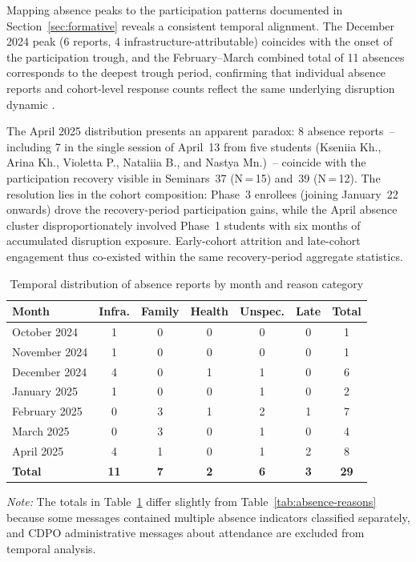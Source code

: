 Mapping absence peaks to the participation patterns documented in Section~\ref{sec:formative} reveals a consistent temporal alignment. The December 2024 peak (6 reports, 4 infrastructure-attributable) coincides with the onset of the participation trough, and the February--March combined total of 11 absences corresponds to the deepest trough period, confirming that individual absence reports and cohort-level response counts reflect the same underlying disruption dynamic \cite{Humeniuk2022113}.

The April 2025 distribution presents an apparent paradox: 8 absence reports~-- including 7 in the single session of April~13 from five students (Kseniia Kh., Arina Kh., Violetta P., Nataliia B., and Nastya Mn.)~-- coincide with the participation recovery visible in Seminars~37 (N\,=\,15) and~39 (N\,=\,12). The resolution lies in the cohort composition: Phase~3 enrollees (joining January~22 onwards) drove the recovery-period participation gains, while the April absence cluster disproportionately involved Phase~1 students with six months of accumulated disruption exposure. Early-cohort attrition and late-cohort engagement thus co-existed within the same recovery-period aggregate statistics.

\begin{table}[!h]
\centering
\caption{Temporal distribution of absence reports by month and reason category}
\label{tab:absence-temporal}
\small
\begin{tabular}{lcccccc}
\hline
\textbf{Month} & \textbf{Infra.} & \textbf{Family} & \textbf{Health} & \textbf{Unspec.} & \textbf{Late} & \textbf{Total} \\
\hline
October 2024  & 1 & 0 & 0 & 0 & 0 & 1 \\
November 2024 & 1 & 0 & 0 & 0 & 0 & 1 \\
December 2024 & 4 & 0 & 1 & 1 & 0 & 6 \\
January 2025  & 1 & 0 & 0 & 1 & 0 & 2 \\
February 2025 & 0 & 3 & 1 & 2 & 1 & 7 \\
March 2025    & 0 & 3 & 0 & 1 & 0 & 4 \\
April 2025    & 4 & 1 & 0 & 1 & 2 & 8 \\
\hline
\textbf{Total} & \textbf{11} & \textbf{7} & \textbf{2} & \textbf{6} & \textbf{3} & \textbf{29} \\
\hline
\end{tabular}
\end{table}

\textit{Note:} The totals in Table~\ref{tab:absence-temporal} differ slightly from Table~\ref{tab:absence-reasons} because some messages contained multiple absence indicators classified separately, and CDPO administrative messages about attendance are excluded from temporal analysis.

